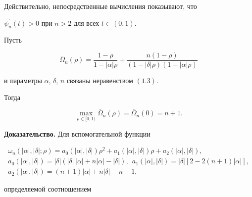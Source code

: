 Действительно, непосредственные вычисления показывают, что


$\psi_n^\prime(t)>0$ при $n>2$ для всех $t\in (0,1)$.





\begin{lem}


Пусть


$$


\overline\Omega_n(\rho)=\frac{1-\rho}


{1-|\alpha|\rho}+\frac{n(1-\rho)}


{(1-|\delta|\rho)(1-|\alpha|\rho)}


$$


и параметры $\alpha$, $\delta$, $n$ связаны неравенством $(1.3)$.


Тогда


\begin{equation}


\max\limits_{\rho\in [0,1)}\overline\Omega_n(\rho)=\overline\Omega_n(0)=n+1.


\end{equation}


\end{lem}





{\bf Доказательство.} Для вспомогательной функции


\begin{gather*}


\omega_n(|\alpha|,|\delta|;\rho)=


a_{0}(|\alpha|,|\delta|) \rho^2+


a_{1}(|\alpha|,|\delta|) \rho +


a_{2}(|\alpha|,|\delta|), \\


%


a_{0}(|\alpha|,|\delta|)=|\delta|


(|\delta|\,|\alpha|+n|\alpha|-|\delta|),\ \


a_{1}(|\alpha|,|\delta|) =


|\delta|[2-2(n+1)|\alpha|], \\


%


a_{2}(|\alpha|,|\delta|)=


(n+1)|\alpha|+n|\delta|-n-1,


\end{gather*}


определяемой соотношением


